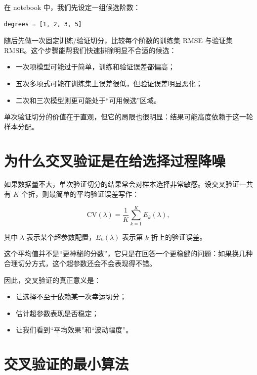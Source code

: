 在 notebook 中，我们先设定一组候选阶数：

\begin{examplebox}[候选超参数]
\begin{lstlisting}[style=pythonstyle]
degrees = [1, 2, 3, 5]
\end{lstlisting}
\end{examplebox}

随后先做一次固定训练/验证切分，比较每个阶数的训练集 RMSE 与验证集 RMSE。这个步骤能帮我们快速排除明显不合适的候选：

\begin{itemize}
    \item 一次项模型可能过于简单，训练和验证误差都偏高；
    \item 五次多项式可能在训练集上误差很低，但验证误差明显恶化；
    \item 二次和三次模型则更可能处于“可用候选”区域。
\end{itemize}

单次验证切分的价值在于直观，但它的局限也很明显：结果可能高度依赖于这一轮样本分配。

\section{为什么交叉验证是在给选择过程降噪}

如果数据量不大，单次验证切分的结果常会对样本选择非常敏感。设交叉验证一共有 $K$ 个折，则最简单的平均验证误差写作：

\[
\mathrm{CV}(\lambda) =
\frac{1}{K}\sum_{k=1}^{K} E_k(\lambda),
\]

其中 $\lambda$ 表示某个超参数配置，$E_k(\lambda)$ 表示第 $k$ 折上的验证误差。

这个平均值并不是“更神秘的分数”，它只是在回答一个更稳健的问题：如果换几种合理切分方式，这个超参数还会不会表现得不错。

因此，交叉验证的真正意义是：

\begin{itemize}
    \item 让选择不至于依赖某一次幸运切分；
    \item 估计超参数表现是否稳定；
    \item 让我们看到“平均效果”和“波动幅度”。
\end{itemize}

\section{交叉验证的最小算法}


